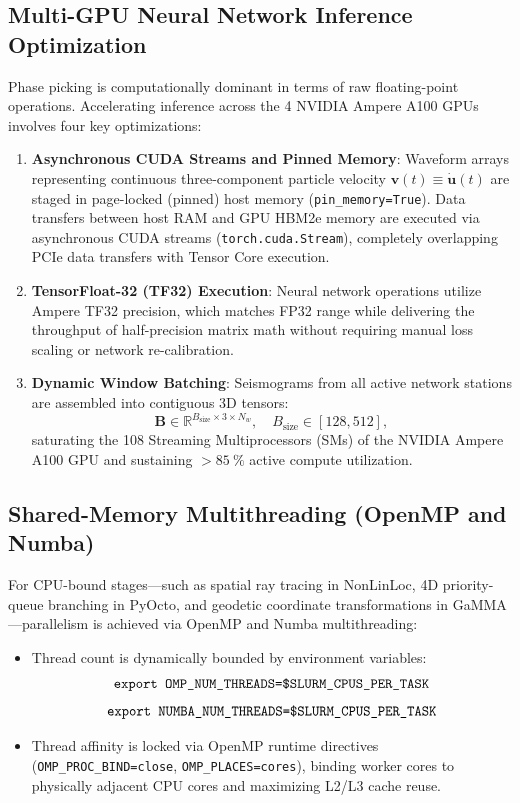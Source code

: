 \subsection{Multi-GPU Neural Network Inference Optimization}
Phase picking is computationally dominant in terms of raw
floating-point operations. Accelerating inference across the \num{4}
NVIDIA Ampere A100 \acp{GPU} involves four key optimizations:
\begin{enumerate}
  \item \textbf{Asynchronous CUDA Streams and Pinned Memory}:
    Waveform arrays representing continuous three-component particle
    velocity $\mathbf{v}(t) \equiv \dot{\mathbf{u}}(t)$ are staged in
    page-locked (pinned) host memory (\texttt{pin\_memory=True}). Data
    transfers between host \ac{RAM} and \ac{GPU} HBM2e memory are executed
    via asynchronous CUDA streams (\texttt{torch.cuda.Stream}), completely
    overlapping PCIe data transfers with Tensor Core execution.
  \item \textbf{TensorFloat-32 (TF32) Execution}: Neural network
    operations utilize Ampere TF32 precision, which matches FP32
    range while delivering the throughput of half-precision matrix
    math without requiring manual loss scaling or network re-calibration.
  \item \textbf{Dynamic Window Batching}: Seismograms from all
    active network stations are assembled into contiguous 3D tensors:
    \begin{equation}
      \mathbf{B} \in \mathbb{R}^{B_{\mathrm{size}} \times 3 \times
      N_w}, \quad B_{\mathrm{size}} \in [\num{128}, \num{512}],
    \end{equation}
    saturating the \num{108} Streaming Multiprocessors (SMs) of the
    NVIDIA Ampere A100
    \ac{GPU} and sustaining $> \qty{85}{\percent}$ active compute utilization.
\end{enumerate}

\subsection{Shared-Memory Multithreading (OpenMP and Numba)}
For \ac{CPU}-bound stages---such as spatial ray tracing in \ac{NonLinLoc}, 4D
priority-queue branching in \ac{PyOcto}, and geodetic coordinate
transformations in \ac{GaMMA}---parallelism is achieved via OpenMP and
Numba multithreading:
\begin{itemize}
  \item Thread count is dynamically bounded by environment variables:
    \begin{equation}
      \text{\texttt{export OMP\_NUM\_THREADS=\$SLURM\_CPUS\_PER\_TASK}}
    \end{equation}
    \begin{equation}
      \text{\texttt{export NUMBA\_NUM\_THREADS=\$SLURM\_CPUS\_PER\_TASK}}
    \end{equation}
  \item Thread affinity is locked via OpenMP runtime directives
    (\texttt{OMP\_PROC\_BIND=close}, \texttt{OMP\_PLACES=cores}),
    binding worker cores to physically adjacent \ac{CPU} cores and
    maximizing L2/L3 cache reuse.
\end{itemize}

